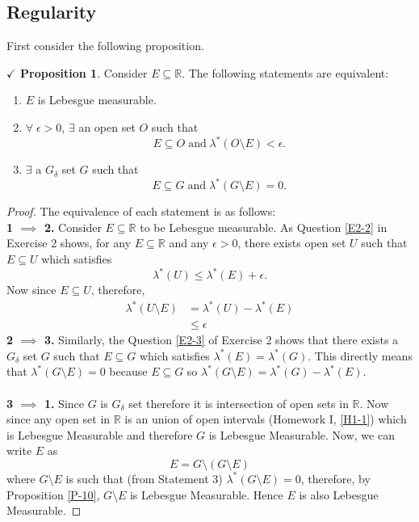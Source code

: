 \documentclass{article}
\theoremstyle{definition}
\theoremstyle{remark}
\theoremstyle{definition}
\theoremstyle{definition}
\newtheorem{proposition}{$\checkmark$ Proposition}
\theoremstyle{definition}
\newcommand{\R}{\mathbb{R}}
\newcommand{\bor}[1]{\mathscr{B}(#1)}
\newcommand{\lom}[1]{\lambda^*\left (#1\right )}
\newcommand{\lm}[1]{\lambda\left (#1\right )}
\begin{document}
\subsection{Regularity}
First consider the following proposition.
\begin{proposition}
	\label{P-15}
	Consider $ E \subseteq \R$. The following statements are equivalent:
	\begin{enumerate}
		\item {$ E $ is Lebesgue measurable.}
		\item {$ \forall \;\epsilon >0$, $ \exists  $ an open set $ O $ such that 
	\[E\subseteq O\;\text{and}\;\lom{O\setminus E} < \epsilon.\]	
	}
\item {$ \exists $ a $ G_\delta $ set $ G $ such that
\[E\subseteq G\;\text{and}\;\lom{G\setminus E} = 0.\]
}
	\end{enumerate}
\end{proposition}
\begin{proof}The equivalence of each statement is as follows:\\
	\textbf{1 $ \implies $ 2.} Consider $ E\subseteq  \R$ to be Lebesgue measurable. As Question \ref{E2-2} in Exercise 2 shows, for any $ E\subseteq \R $ and any $ \epsilon > 0 $, there exists open set $ U $ such that $ E\subseteq U $ which satisfies
	\[\lom{U}\le \lom{E} + \epsilon.\]
	Now since $ E\subseteq U $, therefore,
	\begin{equation*}
		\begin{split}
			\lom{U\setminus E} &= \lom{U} - \lom{E}\\
			&\le \epsilon
		\end{split}
	\end{equation*}
\textbf{2 $ \implies $ 3.} Similarly, the Question \ref{E2-3} of Exercise 2 shows that there exists a $ G_\delta $ set $ G $ such that $ E\subseteq G $ which satisfies $ \lom{E} = \lom{G} $. This directly means that $ \lom{G\setminus E} = 0$ because $ E\subseteq G $ so $ \lom{G\setminus E} = \lom{G} -\lom{E} $.\\\\
\textbf{3 $ \implies $ 1.} Since $ G $ is $ G_\delta $ set therefore it is intersection of open sets in $ \R $. Now since any open set in $ \R $ is an union of open intervals (Homework I, \ref{H1-1}) which is Lebesgue Measurable and therefore $ G $ is Lebesgue Measurable. Now, we can write $ E $ as
\[E = G \setminus (G\setminus E)\]
where $ G\setminus E $ is such that (from Statement 3) $ \lom{G\setminus E} = 0 $, therefore, by Proposition \ref{P-10}, $ G\setminus E $ is Lebesgue Measurable. Hence $ E $ is also Lebesgue Measurable.

\end{proof}
\hrulefill
\end{document}

